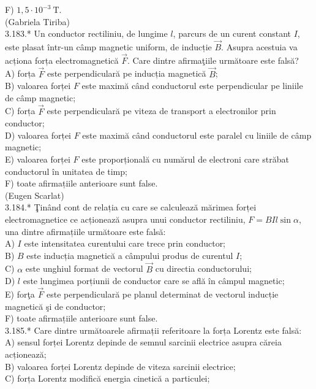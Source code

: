 \documentclass[10pt]{article}
\begin{document}
F) $1,5 \cdot 10^{-3} \mathrm{~T}$.\\
(Gabriela Tiriba)\\
3.183.* Un conductor rectiliniu, de lungime $l$, parcurs de un curent constant $I$, este plasat într-un câmp magnetic uniform, de inducție $\vec{B}$. Asupra acestuia va acționa forța electromagnetică $\vec{F}$. Care dintre afirmaţiile următoare este falsă?\\
A) forța $\vec{F}$ este perpendiculară pe inducția magnetică $\vec{B}$;\\
B) valoarea forței $F$ este maximă când conductorul este perpendicular pe liniile de câmp magnetic;\\
C) forța $\vec{F}$ este perpendiculară pe viteza de transport a electronilor prin conductor;\\
D) valoarea forței $F$ este maximă când conductorul este paralel cu liniile de câmp magnetic;\\
E) valoarea forței $F$ este proporțională cu numărul de electroni care străbat conductorul în unitatea de timp;\\
F) toate afirmațiile anterioare sunt false.\\
(Eugen Scarlat)\\
3.184.* Ţinând cont de relația cu care se calculează mărimea forței electromagnetice ce acționează asupra unui conductor rectiliniu, $F=B I l \sin \alpha$, una dintre afirmațiile următoare este falsă:\\
A) $I$ este intensitatea curentului care trece prin conductor;\\
B) $B$ este inducția magnetică a câmpului produs de curentul $I$;\\
C) $\alpha$ este unghiul format de vectorul $\vec{B}$ cu directia conductorului;\\
D) $l$ este lungimea porțiunii de conductor care se află în câmpul magnetic;\\
E) forţa $\vec{F}$ este perpendiculară pe planul determinat de vectorul inducție magnetică şi de conductor;\\
F) toate afirmațiile anterioare sunt false.\\
3.185.* Care dintre următoarele afirmații referitoare la forța Lorentz este falsă:\\
A) sensul forței Lorentz depinde de semnul sarcinii electrice asupra căreia acționează;\\
B) valoarea forței Lorentz depinde de viteza sarcinii electrice;\\
C) forța Lorentz modifică energia cinetică a particulei;\\
\end{document}
